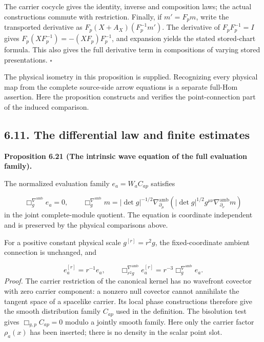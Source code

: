 \documentclass[
  english,
  11pt,
  reqno]{amsart}
\makeatletter
\newcommand{\pandocstatementheading}[1]{%
  \par\addpenalty{\@beginparpenalty}%
  \addvspace{.5\baselineskip plus .2\baselineskip minus .2\baselineskip}%
  {\normalfont\bfseries #1\par}%
  \nobreak\@afterindenttrue\@afterheading
}
\makeatother
\begin{document}
The carrier cocycle gives the identity, inverse and composition laws;
the actual constructions commute with restriction. Finally, if
\(m'=F_pm\), write the transported derivative as
\(F_p(X+A_X)(F_p^{-1}m')\). The derivative of \(F_pF_p^{-1}=I\) gives
\(F_p(XF_p^{-1})=-(XF_p)F_p^{-1}\), and expansion yields the stated
stored-chart formula. This also gives the full derivative term in
compositions of varying stored presentations. \hfill\(\square\)

The physical isometry in this proposition is supplied. Recognizing every
physical map from the complete source-side arrow equations is a separate
full-Hom assertion. Here the proposition constructs and verifies the
point-connection part of the induced comparison.

\subsection{6.11. The differential law and finite
estimates}\label{the-differential-law-and-finite-estimates}\label{sec:online-evaluation-wave-differential-law}

\pandocstatementheading{\leavevmode{}\label{prop:online-evaluation-wave-equation}Proposition 6.21 (The intrinsic wave equation of the full evaluation
family).}

The normalized evaluation family \(e_a=W_aC_{ap}\) satisfies

\label{eq:online-evaluation-ambient-wave-equation} \[
\Box_g^{\nabla^{\mathrm{amb}}}e_a=0,
\qquad
\Box_g^{\nabla^{\mathrm{amb}}}m
=|\det g|^{-1/2}
\nabla^{\mathrm{amb}}_{\partial_\mu}
\left(|\det g|^{1/2}g^{\mu\nu}
\nabla^{\mathrm{amb}}_{\partial_\nu}m\right)
\] in the joint complete-module quotient. The equation is coordinate
independent and is preserved by the physical comparisons above.

For a positive constant physical scale \(g^{[r]}=r^2g\), the
fixed-coordinate ambient connection is unchanged, and

\label{eq:online-ambient-wave-physical-scale} \[
e_a^{[r]}=r^{-1}e_a,
\qquad
\Box_{r^2g}^{\nabla^{\mathrm{amb}}}e_a^{[r]}
=r^{-3}\Box_g^{\nabla^{\mathrm{amb}}}e_a.
\] \emph{Proof.} The carrier restriction of the canonical kernel has no
wavefront covector with zero carrier component: a nonzero null covector
cannot annihilate the tangent space of a spacelike carrier. Its local
phase constructions therefore give the smooth distribution family
\(C_{ap}\) used in the definition. The bisolution test gives
\(\Box_{g,p}C_{ap}=0\) modulo a jointly smooth family. Here only the
carrier factor \(\rho_a(x)\) has been inserted; there is no density in
the scalar point slot.
\end{document}
